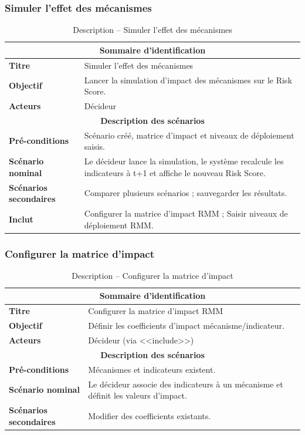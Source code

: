 \subsubsection{Simuler l'effet des mécanismes}
\begin{table}[H]
\centering
\renewcommand{\arraystretch}{1.3}
\begin{tabular}{@{}p{}p{}@{}}
\hline
\multicolumn{2}{c}{\textbf{Sommaire d'identification}} \\
\hline
\textbf{Titre} & Simuler l'effet des mécanismes \\
\textbf{Objectif} & Lancer la simulation d'impact des mécanismes sur le Risk Score. \\
\textbf{Acteurs} & Décideur \\
\hline
\multicolumn{2}{c}{\textbf{Description des scénarios}} \\
\hline
\textbf{Pré-conditions} & Scénario créé, matrice d'impact et niveaux de déploiement saisis. \\
\textbf{Scénario nominal} & Le décideur lance la simulation, le système recalcule les indicateurs à t+1 et affiche le nouveau Risk Score. \\
\textbf{Scénarios secondaires} & Comparer plusieurs scénarios ; sauvegarder les résultats. \\
\textbf{Inclut} & Configurer la matrice d'impact RMM ; Saisir niveaux de déploiement RMM. \\
\hline
\end{tabular}
\caption{Description -- Simuler l'effet des mécanismes}
\end{table}

\subsubsection{Configurer la matrice d'impact}
\begin{table}[H]
\centering
\renewcommand{\arraystretch}{1.3}
\begin{tabular}{@{}p{}p{}@{}}
\hline
\multicolumn{2}{c}{\textbf{Sommaire d'identification}} \\
\hline
\textbf{Titre} & Configurer la matrice d'impact RMM \\
\textbf{Objectif} & Définir les coefficients d'impact mécanisme/indicateur. \\
\textbf{Acteurs} & Décideur (via <<include>>) \\
\hline
\multicolumn{2}{c}{\textbf{Description des scénarios}} \\
\hline
\textbf{Pré-conditions} & Mécanismes et indicateurs existent. \\
\textbf{Scénario nominal} & Le décideur associe des indicateurs à un mécanisme et définit les valeurs d'impact. \\
\textbf{Scénarios secondaires} & Modifier des coefficients existants. \\
\hline
\end{tabular}
\caption{Description -- Configurer la matrice d'impact}
\end{table}

